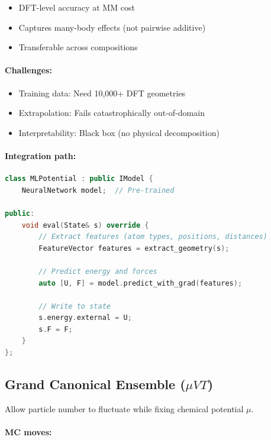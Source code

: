 \documentclass[11pt]{article}
\begin{document}
\begin{itemize}
\item DFT-level accuracy at MM cost
\item Captures many-body effects (not pairwise additive)
\item Transferable across compositions
\end{itemize}

\paragraph{Challenges:}

\begin{itemize}
\item Training data: Need 10,000+ DFT geometries
\item Extrapolation: Fails catastrophically out-of-domain
\item Interpretability: Black box (no physical decomposition)
\end{itemize}

\paragraph{Integration path:}

\begin{lstlisting}[language=C++]
class MLPotential : public IModel {
    NeuralNetwork model;  // Pre-trained
    
public:
    void eval(State& s) override {
        // Extract features (atom types, positions, distances)
        FeatureVector features = extract_geometry(s);
        
        // Predict energy and forces
        auto [U, F] = model.predict_with_grad(features);
        
        // Write to state
        s.energy.external = U;
        s.F = F;
    }
};
\end{lstlisting}

\subsection{Grand Canonical Ensemble ($\mu VT$)}

Allow particle number to fluctuate while fixing chemical potential $\mu$.

\paragraph{MC moves:}
\end{document}
